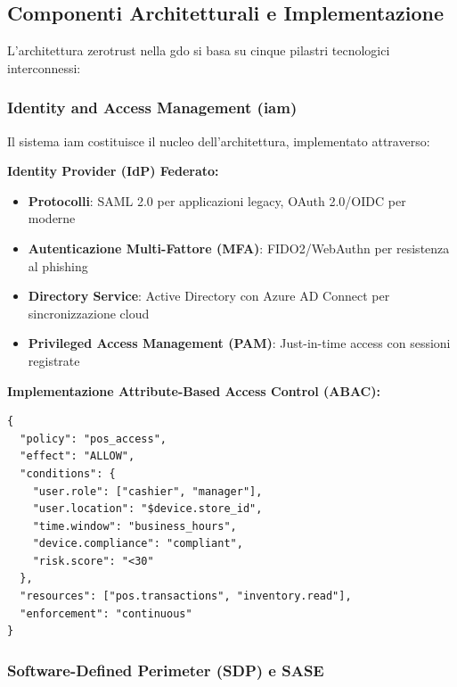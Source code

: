 \subsection{\texorpdfstring{Componenti Architetturali e Implementazione}{3.5.1 - Componenti Architetturali e Implementazione}}

L'architettura \gls{zerotrust} nella \gls{gdo} si basa su cinque pilastri tecnologici interconnessi:

\subsubsection{\texorpdfstring{Identity and Access Management (\gls{iam})}{3.5.1.1 - Identity and Access Management (IAM)}}

Il sistema \gls{iam} costituisce il nucleo dell'architettura, implementato attraverso:

\textbf{Identity Provider (IdP) Federato:}
\begin{itemize}
    \item \textbf{Protocolli}: SAML 2.0 per applicazioni legacy, OAuth 2.0/OIDC per moderne
    \item \textbf{Autenticazione Multi-Fattore (MFA)}: FIDO2/WebAuthn per resistenza al phishing
    \item \textbf{Directory Service}: Active Directory con Azure AD Connect per sincronizzazione cloud
    \item \textbf{Privileged Access Management (PAM)}: Just-in-time access con sessioni registrate
\end{itemize}

\textbf{Implementazione Attribute-Based Access Control (ABAC):}
\begin{lstlisting}[caption={Policy ABAC per accesso POS},label={lst:abac_policy}]
{
  "policy": "pos_access",
  "effect": "ALLOW",
  "conditions": {
    "user.role": ["cashier", "manager"],
    "user.location": "$device.store_id",
    "time.window": "business_hours",
    "device.compliance": "compliant",
    "risk.score": "<30"
  },
  "resources": ["pos.transactions", "inventory.read"],
  "enforcement": "continuous"
}
\end{lstlisting}

\subsubsection{\texorpdfstring{Software-Defined Perimeter (SDP) e SASE}{3.5.1.2 - Software-Defined Perimeter (SDP) e SASE}}

